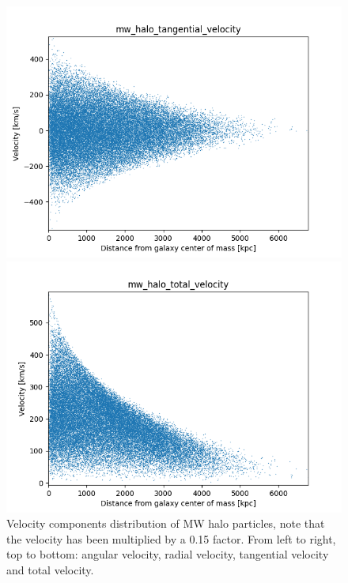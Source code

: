 \documentclass[a4paper,12pt, english]{article}
\begin{document}
\begin{figure}
\begin{minipage}{0.45\textwidth}
\includegraphics[width=1\textwidth]{VelocityDistr/mw_halo_tangential_velocity.png}
\end{minipage}
\begin{minipage}{0.45\textwidth}
  \centering
\includegraphics[width=1\textwidth]{VelocityDistr/mw_halo_total_velocity.png}
\end{minipage}
\caption{Velocity components distribution of MW halo particles, note that the velocity has been multiplied by a 0.15 factor. From left to right, top to bottom: angular velocity, radial velocity, tangential velocity and total velocity.}
\label{fig:halo-vel}
\end{figure}
\end{document}
